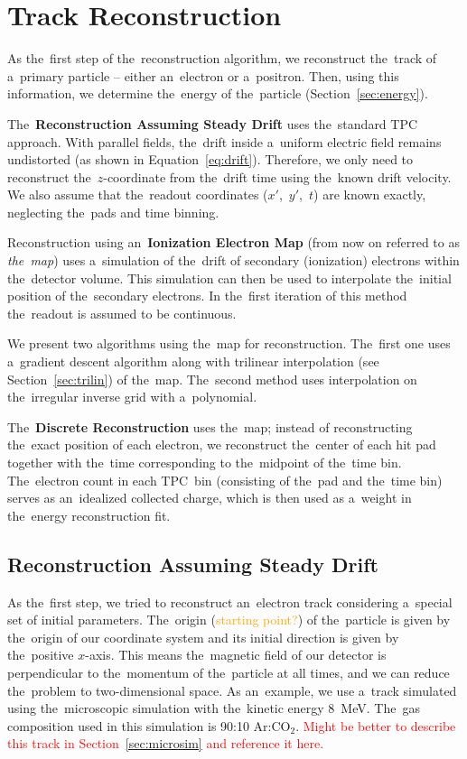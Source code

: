 \chapter{Track Reconstruction}
\label{sec:track}
	As the~first step of the~reconstruction algorithm, we reconstruct the~track of a~primary particle -- either an~electron or a~positron. Then, using this information, we determine the~energy of the~particle (Section~\ref{sec:energy}).
	
	The~\textbf{Reconstruction Assuming Steady Drift} uses the~standard \ac{TPC} approach. With parallel fields, the~drift inside a~uniform electric field remains undistorted (as shown in Equation~\ref{eq:drift}). Therefore, we only need to reconstruct the~$z$\nobreakdash-coordinate from the~drift time using the~known drift velocity. We also assume that the~readout coordinates ($x'$,~$y'$,~$t$) are known exactly, neglecting the~pads and time binning.
	
	Reconstruction using an~\textbf{Ionization Electron Map} (from now on referred to as \emph{the~map}) uses a~simulation of the~drift of secondary (ionization) electrons within the~detector volume. This simulation can then be used to interpolate the~initial position of the~secondary electrons. In the~first iteration of this method the~readout is assumed to be continuous.
	
	We present two algorithms using the~map for reconstruction. The~first one uses a~gradient descent algorithm along with trilinear interpolation (see Section~\ref{sec:trilin}) of the~map. The~second method uses interpolation on the~irregular inverse grid with a~polynomial.
	
	The~\textbf{Discrete Reconstruction} uses the~map; instead of reconstructing the~exact position of each electron, we reconstruct the~center of each hit pad together with the~time corresponding to the~midpoint of the~time bin. The~electron count in each \ac{TPC}~bin (consisting of the~pad and the~time bin) serves as an~idealized collected charge, which is then used as a~weight in the~energy reconstruction fit.
	
	\section{Reconstruction Assuming Steady Drift}
	\label{sec:trackfirst}
		As the~first step, we tried to reconstruct an~electron track considering a~special set of initial parameters. The~origin (\textcolor{orange}{starting point?}) of the~particle is given by the~origin of our coordinate system and its initial direction is given by the~positive $x$\nobreakdash-axis. This means the~magnetic field of our detector is perpendicular to the~momentum of the~particle at all times, and we can reduce the~problem to two-dimensional space. As an~example, we use a~track simulated using the~microscopic simulation with the~kinetic energy 8~MeV. The~gas composition used in this simulation is 90:10 Ar:CO$_2$. \textcolor{red}{Might be better to describe this track in Section~\ref{sec:microsim} and reference it here.}
		

